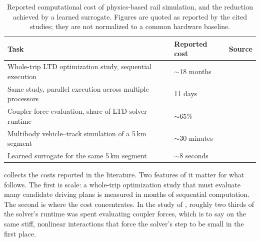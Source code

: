 \begin{table}[h]
    \centering
    \begin{tabular}{llc}
        \toprule
        Task & Reported cost & Source \\
        \midrule
        Whole-trip LTD optimization study, sequential execution & $\sim$18 months & \cite{wu2019highfidelity} \\
        Same study, parallel execution across multiple processors & 11 days & \cite{wu2019highfidelity} \\
        Coupler-force evaluation, share of LTD solver runtime & $\sim$65\% & \cite{Wu2018ComputingSchemesLTD} \\
        Multibody vehicle--track simulation of a 5\,km segment & $\sim$30 minutes & \cite{zhou_surrogate_integration} \\
        Learned surrogate for the same 5\,km segment & $\sim$8 seconds & \cite{zhou_surrogate_integration} \\
        \bottomrule
    \end{tabular}
    \caption{Reported computational cost of physics-based rail simulation, and the reduction achieved by a learned surrogate. Figures are quoted as reported by the cited studies; they are not normalized to a common hardware baseline.}
    \label{tab:computational_cost}
\end{table}


 collects the costs reported in the literature. Two features of it matter for what follows. The first is scale: a whole-trip optimization study that must evaluate many candidate driving plans is measured in months of sequential computation. The second is where the cost concentrates. In the study of \cite{Wu2018ComputingSchemesLTD}, roughly two thirds of the solver's runtime was spent evaluating coupler forces, which is to say on the same stiff, nonlinear interactions that force the solver's step to be small in the first place.

